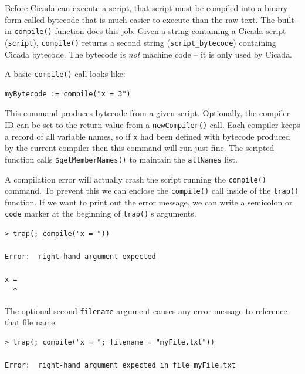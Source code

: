 \documentclass{article}
\newenvironment{code}{
       \begin{list}{}{
               \setlength{\leftmargin}{.4in}
               \setlength{\rightmargin}{0in}
               \setlength{\topsep}{.2in}
       }
       \small
       \item[] }
       { \end{list}   }
\begin{document}
Before Cicada can execute a script, that script must be compiled into a binary form called bytecode that is much easier to execute than the raw text.  The built-in \texttt{compile()} function does this job.  Given a string containing a Cicada script (\verb#script#), \verb#compile()# returns a second string (\verb#script_bytecode#) containing Cicada bytecode.  The bytecode is \emph{not} machine code -- it is only used by Cicada.

A basic \verb#compile()# call looks like:

\begin{code} \begin{verbatim}
myBytecode := compile("x = 3")
\end{verbatim} \end{code}

\noindent This command produces bytecode from a given script.  Optionally, the compiler ID can be set to the return value from a \verb#newCompiler()# call.  Each compiler keeps a record of all variable names, so if \verb#x# had been defined with bytecode produced by the current compiler then this command will run just fine.  The scripted function calls \verb#$getMemberNames()# to maintain the \verb#allNames# list.

A compilation error will actually crash the script running the \verb#compile()# command.  To prevent this we can enclose the \verb#compile()# call inside of the \verb#trap()# function.  If we want to print out the error message, we can write a semicolon or \verb#code# marker at the beginning of \verb#trap()#'s arguments.

\begin{code} \begin{verbatim}
> trap(; compile("x = "))

Error:  right-hand argument expected

x =
  ^
\end{verbatim} \end{code}

\noindent The optional second \verb#filename# argument causes any error message to reference that file name.

\begin{code} \begin{verbatim}
> trap(; compile("x = "; filename = "myFile.txt"))

Error:  right-hand argument expected in file myFile.txt
\end{verbatim} \end{code}
\end{document}
